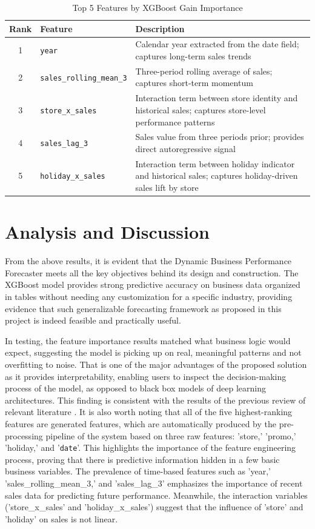 \documentclass[12pt]{article}
\begin{document}
\begin{table}[h]
\centering
\begin{tabular}{clp{7.5cm}}
\hline
\hline
\textbf{Rank} & \textbf{Feature} & \textbf{Description} \\
\hline
  1 & \texttt{year}                    & Calendar year extracted from the date field; captures long-term sales trends \\ \hline
  2 & \texttt{sales\_rolling\_mean\_3} & Three-period rolling average of sales; captures short-term momentum \\ \hline
  3 & \texttt{store\_x\_sales}         & Interaction term between store identity and historical sales; captures store-level performance patterns \\ \hline
  4 & \texttt{sales\_lag\_3}           & Sales value from three periods prior; provides direct autoregressive signal \\ \hline
  5 & \texttt{holiday\_x\_sales}       & Interaction term between holiday indicator and historical sales; captures holiday-driven sales lift by store \\ \hline
\hline
\end{tabular}
\caption{Top 5 Features by XGBoost Gain Importance}
\label{tab:features}
\end{table}

\section{Analysis and Discussion}
From the above results, it is evident that the Dynamic Business Performance
Forecaster meets all the key objectives behind its design and construction. The XGBoost model provides strong predictive accuracy on business data organized in tables without needing any customization for a specific industry, providing evidence that such generalizable
forecasting framework as proposed in this project is indeed feasible and practically useful.

In testing, the feature importance results matched what business logic would expect, suggesting the model is picking up on real, meaningful patterns and not overfitting to noise. That is one of the major advantages of the proposed
solution as it provides interpretability, enabling users to inspect the decision-making process
of the model, as opposed to black box models of deep learning architectures. This finding is
consistent with the results of the previous review of relevant literature \cite{PredictiveAnalytics}.
It is also worth noting that all of the five highest-ranking features are generated features, which are automatically produced by the pre-processing pipeline of the system based on three raw features: 'store,' 'promo,' 'holiday,' and '\texttt{date}'. This highlights the importance of the feature engineering process, proving that there is predictive information hidden in a few basic business variables. The prevalence of time-based features such as 'year,' 'sales\_rolling\_mean\_3,' and 'sales\_lag\_3' emphasizes the importance of recent sales data for predicting future performance. Meanwhile, the interaction variables ('store\_x\_sales' and 'holiday\_x\_sales') suggest that the influence of 'store' and 'holiday' on sales is not linear.
\end{document}
